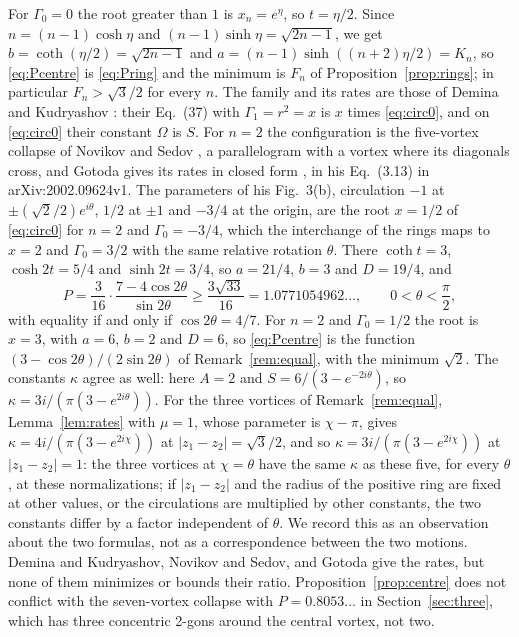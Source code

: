 \documentclass[11pt]{article}
\theoremstyle{definition}
\begin{document}
For $\Gamma_0 = 0$ the root greater than $1$ is $x_n = e^\eta$, so $t = \eta/2$. Since $n = (n - 1)\cosh\eta$ and $(n - 1)\sinh\eta = \sqrt{2n - 1}$, we get $b = \coth(\eta/2) = \sqrt{2n - 1}$ and $a = (n - 1)\sinh((n + 2)\eta/2) = K_n$, so \eqref{eq:Pcentre} is \eqref{eq:Pring} and the minimum is $F_n$ of Proposition~\ref{prop:rings}; in particular $F_n > \sqrt{3}/2$ for every $n$. The family and its rates are those of Demina and Kudryashov \cite[Sect.~3, Eqs.~(36)--(37)]{dk2014}: their Eq.~(37) with $\Gamma_1 = r^2 = x$ is $x$ times \eqref{eq:circ0}, and on \eqref{eq:circ0} their constant $\Omega$ is $S$. For $n = 2$ the configuration is the five-vortex collapse of Novikov and Sedov \cite{ns1979}, a parallelogram with a vortex where its diagonals cross, and Gotoda gives its rates in closed form \cite{gotoda2021}, in his Eq.~(3.13) in arXiv:2002.09624v1. The parameters of his Fig.~3(b), circulation $-1$ at $\pm(\sqrt{2}/2)e^{i\theta}$, $1/2$ at $\pm 1$ and $-3/4$ at the origin, are the root $x = 1/2$ of \eqref{eq:circ0} for $n = 2$ and $\Gamma_0 = -3/4$, which the interchange of the rings maps to $x = 2$ and $\Gamma_0 = 3/2$ with the same relative rotation $\theta$. There $\coth t = 3$, $\cosh 2t = 5/4$ and $\sinh 2t = 3/4$, so $a = 21/4$, $b = 3$ and $D = 19/4$, and
\[
  P = \frac{3}{16}\cdot\frac{7 - 4\cos 2\theta}{\sin 2\theta} \ge \frac{3\sqrt{33}}{16} = 1.0771054962\ldots, \qquad 0 < \theta < \frac{\pi}{2},
\]
with equality if and only if $\cos 2\theta = 4/7$. For $n = 2$ and $\Gamma_0 = 1/2$ the root is $x = 3$, with $a = 6$, $b = 2$ and $D = 6$, so \eqref{eq:Pcentre} is the function $(3 - \cos 2\theta)/(2\sin 2\theta)$ of Remark~\ref{rem:equal}, with the minimum $\sqrt{2}$. The constants $\kappa$ agree as well: here $A = 2$ and $S = 6/(3 - e^{-2i\theta})$, so $\kappa = 3i/(\pi(3 - e^{2i\theta}))$. For the three vortices of Remark~\ref{rem:equal}, Lemma~\ref{lem:rates} with $\mu = 1$, whose parameter is $\chi - \pi$, gives $\kappa = 4i/(\pi(3 - e^{2i\chi}))$ at $|z_1 - z_2| = \sqrt{3}/2$, and so $\kappa = 3i/(\pi(3 - e^{2i\chi}))$ at $|z_1 - z_2| = 1$: the three vortices at $\chi = \theta$ have the same $\kappa$ as these five, for every $\theta$, at these normalizations; if $|z_1 - z_2|$ and the radius of the positive ring are fixed at other values, or the circulations are multiplied by other constants, the two constants differ by a factor independent of $\theta$. We record this as an observation about the two formulas, not as a correspondence between the two motions. Demina and Kudryashov, Novikov and Sedov, and Gotoda give the rates, but none of them minimizes or bounds their ratio. Proposition~\ref{prop:centre} does not conflict with the seven-vortex collapse with $P = 0.8053\ldots$ in Section~\ref{sec:three}, which has three concentric 2-gons around the central vortex, not two.
\end{document}
